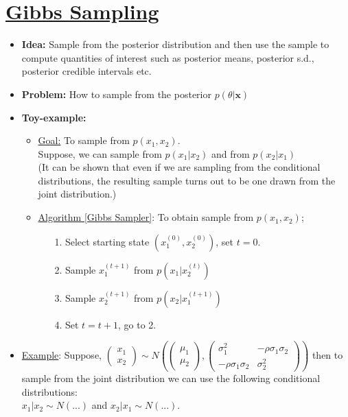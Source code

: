 \documentclass[12pt]{article}
\begin{document}
\section{\underline{Gibbs Sampling}}
\begin{itemize}
\item \textbf{Idea: } Sample from the posterior distribution and then use the sample to compute quantities of interest such as posterior means, posterior s.d., posterior credible intervals etc.
\item \textbf{Problem: } How to sample from the posterior $p(\theta|\mathbf{x})$
\item \textbf{Toy-example: } 

\begin{itemize}
\item \underline{Goal:} To sample from $p(x_1,x_2)$. \\
Suppose, we can sample from $p(x_1|x_2)$ and from $p(x_2|x_1)$ \\
(It can be shown that even if we are sampling from the conditional distributions, the resulting sample turns out  to be one drawn from the joint distribution.)

\item \underline{Algorithm [Gibbs Sampler]}: To obtain sample from $p(x_1,x_2)$;
\begin{enumerate}
\item[1.] Select starting state $(x_1^{(0)}, x_2^{(0)})$, set $t=0$.
\item[2.] Sample $x_1^{(t+1)}$ from $p(x_1 | x_2^{(t)})$
\item[3.] Sample $x_2^{(t+1)}$ from $p(x_2 | x_1^{(t+1)})$
\item[4.] Set $t = t+1$, go to 2.
\end{enumerate}
\end{itemize}

\item \underline{Example}: Suppose, 
$\left(\begin{matrix}x_1\\x_2\end{matrix}\right) \sim N\left(\left(\begin{matrix}\mu_1\\\mu_2\end{matrix}\right),
\left(\begin{matrix}
\sigma^2_1 & -\rho\sigma_1\sigma_2\\
-\rho\sigma_1\sigma_2 & \sigma^2_2
\end{matrix}\right)\right) $
then to sample from the joint distribution we can use the following conditional distributions: \\
$x_1 | x_2 \sim N ( ... )$ and $x_2 | x_1 \sim N ( ... )$.


\end{itemize}
\end{document}
